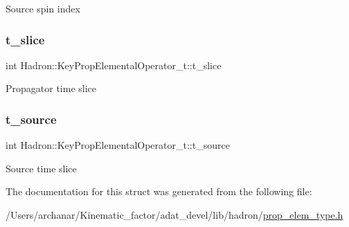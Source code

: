 Source spin index \mbox{\label{structHadron_1_1KeyPropElementalOperator__t_afd52593f348fdfe1a95dc4feec590ed1}} 
\subsubsection{\texorpdfstring{t\_slice}{t\_slice}}
{\footnotesize\ttfamily int Hadron\+::\+Key\+Prop\+Elemental\+Operator\+\_\+t\+::t\+\_\+slice}

Propagator time slice \mbox{\label{structHadron_1_1KeyPropElementalOperator__t_a55ff9327bc33e9bc52d9e5250cd1d0ae}} 
\subsubsection{\texorpdfstring{t\_source}{t\_source}}
{\footnotesize\ttfamily int Hadron\+::\+Key\+Prop\+Elemental\+Operator\+\_\+t\+::t\+\_\+source}

Source time slice 

The documentation for this struct was generated from the following file\+:\begin{DoxyCompactItemize}
\item 
/\+Users/archanar/\+Kinematic\+\_\+factor/adat\+\_\+devel/lib/hadron/\mbox{\hyperlink{lib_2hadron_2prop__elem__type_8h}{prop\+\_\+elem\+\_\+type.\+h}}\end{DoxyCompactItemize}
